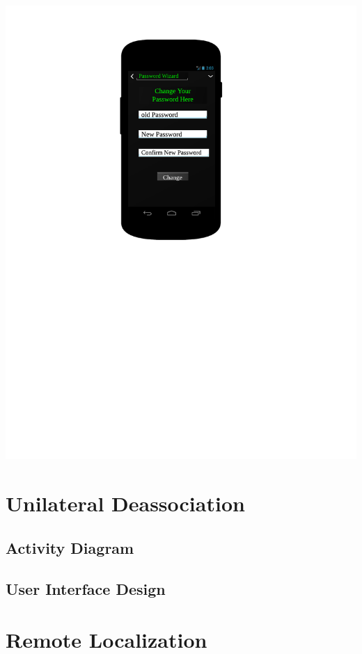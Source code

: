 \includegraphics[scale=0.7]{images/PasswordChange_UI}

\section{Unilateral Deassociation}

\newpage
\subsection{Activity Diagram}

\newpage
\subsection{User Interface Design}

\section{Remote Localization}

\newpage
